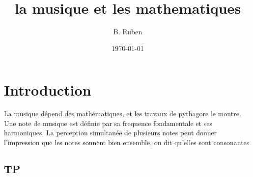 \documentclass{article}
\begin{document}
\title{la musique et les mathematiques}
\author{B. Ruben}
\date{\today}

\maketitle

\section{Introduction}
La musique dépend des mathématiques, et les travaux de pythagore le montre. Une note de musique est définie par sa frequence fondamentale et ses harmoniques. La perception simultanée de plusieurs notes peut donner l'impression que les notes sonnent bien ensemble, on dit qu'elles sont consonantes

\subsection{TP}
\end{document}
